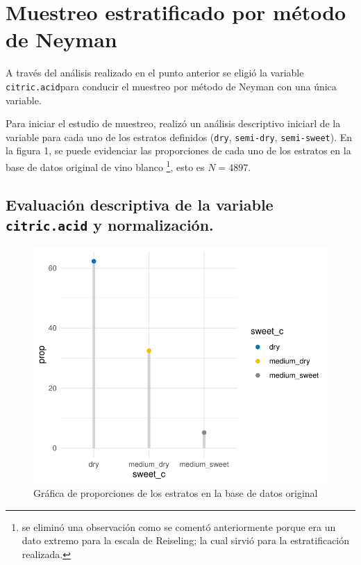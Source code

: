\documentclass[
]{article}
\begin{document}
\hypertarget{muestreo-estratificado-por-muxe9todo-de-neyman}{%
\section{Muestreo estratificado por método de
Neyman}\label{muestreo-estratificado-por-muxe9todo-de-neyman}}

A través del análisis realizado en el punto anterior se eligió la
variable \texttt{citric.acid}para conducir el muestreo por método de
Neyman con una única variable.

Para iniciar el estudio de muestreo, realizó un análisis descriptivo
iniciarl de la variable para cada uno de los estratos definidos
(\texttt{dry}, \texttt{semi-dry}, \texttt{semi-sweet}). En la figura 1,
se puede evidenciar las proporciones de cada uno de los estratos en la
base de datos original de vino blanco \footnote{se eliminó una
  observación como se comentó anteriormente porque era un dato extremo
  para la escala de Reiseling; la cual sirvió para la estratificación
  realizada.}, esto es \(N = 4897\).

\hypertarget{evaluaciuxf3n-descriptiva-de-la-variable-citric.acid-y-normalizaciuxf3n.}{%
\subsection{\texorpdfstring{Evaluación descriptiva de la variable
\texttt{citric.acid} y
normalización.}{Evaluación descriptiva de la variable citric.acid y normalización.}}\label{evaluaciuxf3n-descriptiva-de-la-variable-citric.acid-y-normalizaciuxf3n.}}

\begin{figure}
\centering
\includegraphics{test_2_files/figure-latex/proportion untidy-1.pdf}
\caption{Gráfica de proporciones de los estratos en la base de datos
original}
\end{figure}
\end{document}
